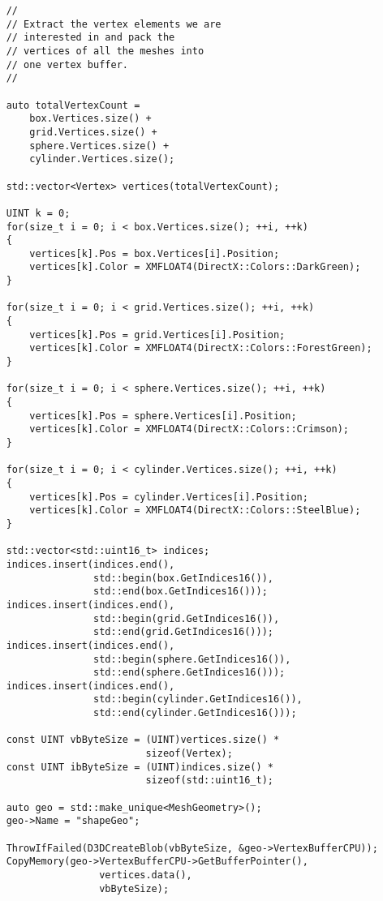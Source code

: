 \begin{lstlisting}
    //
    // Extract the vertex elements we are 
    // interested in and pack the
    // vertices of all the meshes into 
    // one vertex buffer.
    //

    auto totalVertexCount =
        box.Vertices.size() +
        grid.Vertices.size() +
        sphere.Vertices.size() +
        cylinder.Vertices.size();

    std::vector<Vertex> vertices(totalVertexCount);

    UINT k = 0;
    for(size_t i = 0; i < box.Vertices.size(); ++i, ++k)
    {
        vertices[k].Pos = box.Vertices[i].Position;
        vertices[k].Color = XMFLOAT4(DirectX::Colors::DarkGreen);
    }

    for(size_t i = 0; i < grid.Vertices.size(); ++i, ++k)
    {
        vertices[k].Pos = grid.Vertices[i].Position;
        vertices[k].Color = XMFLOAT4(DirectX::Colors::ForestGreen);
    }

    for(size_t i = 0; i < sphere.Vertices.size(); ++i, ++k)
    {
        vertices[k].Pos = sphere.Vertices[i].Position;
        vertices[k].Color = XMFLOAT4(DirectX::Colors::Crimson);
    }

    for(size_t i = 0; i < cylinder.Vertices.size(); ++i, ++k)
    {
        vertices[k].Pos = cylinder.Vertices[i].Position;
        vertices[k].Color = XMFLOAT4(DirectX::Colors::SteelBlue);
    }

    std::vector<std::uint16_t> indices;
    indices.insert(indices.end(), 
                   std::begin(box.GetIndices16()), 
                   std::end(box.GetIndices16()));
    indices.insert(indices.end(), 
                   std::begin(grid.GetIndices16()), 
                   std::end(grid.GetIndices16()));
    indices.insert(indices.end(), 
                   std::begin(sphere.GetIndices16()), 
                   std::end(sphere.GetIndices16()));
    indices.insert(indices.end(), 
                   std::begin(cylinder.GetIndices16()), 
                   std::end(cylinder.GetIndices16()));

    const UINT vbByteSize = (UINT)vertices.size() * 
                            sizeof(Vertex);
    const UINT ibByteSize = (UINT)indices.size() * 
                            sizeof(std::uint16_t);

    auto geo = std::make_unique<MeshGeometry>();
    geo->Name = "shapeGeo";

    ThrowIfFailed(D3DCreateBlob(vbByteSize, &geo->VertexBufferCPU));
    CopyMemory(geo->VertexBufferCPU->GetBufferPointer(), 
                    vertices.data(), 
                    vbByteSize);


\end{lstlisting}
